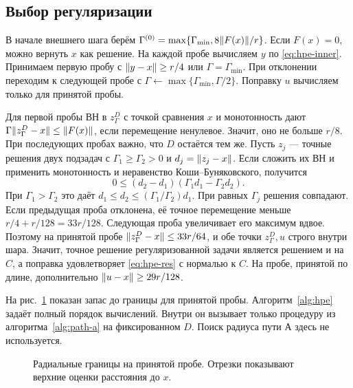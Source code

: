 \subsection{Выбор регуляризации}

В начале внешнего шага берём
$\Gamma^{(0)}=\max\{\Gamma_{\min},8\lVert F(x)\rVert/r\}$.
Если $F(x)=0$, можно вернуть $x$ как решение. На каждой пробе
вычисляем $y$ по \eqref{eq:hpe-inner}. Принимаем первую пробу
с $\lVert y-x\rVert\ge r/4$ или $\Gamma=\Gamma_{\min}$.
При отклонении переходим к следующей пробе с
$\Gamma\gets\max\{\Gamma_{\min},\Gamma/2\}$.
Поправку $u$ вычисляем только для принятой пробы.

Для первой пробы ВН в $z_\Gamma^D$ с точкой сравнения $x$
и монотонность дают
$\Gamma\lVert z_\Gamma^D-x\rVert\le\lVert F(x)\rVert$, если перемещение
ненулевое. Значит, оно не больше $r/8$. При последующих пробах
важно, что $D$ остаётся тем же. Пусть $z_j$ --- точные решения
двух подзадач с $\Gamma_1\ge\Gamma_2>0$ и $d_j=\lVert z_j-x\rVert$.
Если сложить их ВН и применить монотонность и неравенство
Коши--Буняковского, получится
\[
 0\le(d_2-d_1)(\Gamma_1d_1-\Gamma_2d_2).
\]
При $\Gamma_1>\Gamma_2$ это даёт
$d_1\le d_2\le(\Gamma_1/\Gamma_2)d_1$. При равных $\Gamma_j$
решения совпадают. Если предыдущая проба отклонена, её
точное перемещение меньше $r/4+r/128=33r/128$. Следующая
проба увеличивает его максимум вдвое. Поэтому на принятой
пробе $\lVert z_\Gamma^D-x\rVert\le33r/64$, и обе точки $z_\Gamma^D,u$
строго внутри шара. Значит, точное решение регуляризованной
задачи является решением и на $C$, а поправка удовлетворяет
\eqref{eq:hpe-res} с нормалью к $C$. На пробе, принятой по длине,
дополнительно $\lVert u-x\rVert\ge29r/128$.

На рис.~\ref{fig:hpe-radius} показан запас до границы для принятой
пробы. Алгоритм~\ref{alg:hpe} задаёт полный порядок вычислений.
Внутри он вызывает только процедуру \pass{} из алгоритма~\ref{alg:path-a}
на фиксированном $D$. Поиск радиуса пути А здесь не используется.

\begin{figure}[htbp]
\centering
{}
\caption{Радиальные границы на принятой пробе. Отрезки показывают
верхние оценки расстояния до $x$.}\label{fig:hpe-radius}
\end{figure}

